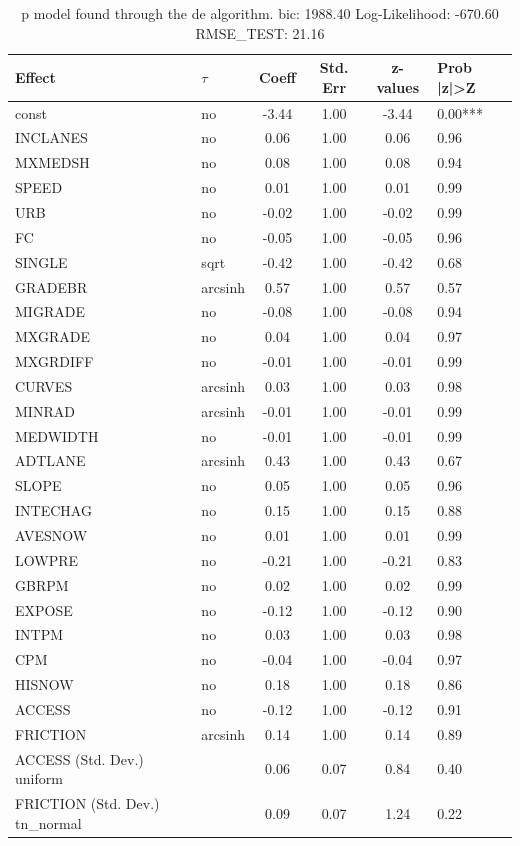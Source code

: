 \begin{table}
	\caption{p model found through the de algorithm. bic: 1988.40 Log-Likelihood: -670.60 RMSE_TEST: 21.16}
	\begin{center}
		\begin{tabular}{|l|l|c|c|c|l|}
			\hline
			Effect & $\tau$ & Coeff & Std. Err & z-values & Prob |z|>Z \\
			\hline
			const & no & -3.44 & 1.00 & -3.44 & 0.00*** \\
			\hline
			INCLANES & no & 0.06 & 1.00 & 0.06 & 0.96 \\
			\hline
			MXMEDSH & no & 0.08 & 1.00 & 0.08 & 0.94 \\
			\hline
			SPEED & no & 0.01 & 1.00 & 0.01 & 0.99 \\
			\hline
			URB & no & -0.02 & 1.00 & -0.02 & 0.99 \\
			\hline
			FC & no & -0.05 & 1.00 & -0.05 & 0.96 \\
			\hline
			SINGLE & sqrt & -0.42 & 1.00 & -0.42 & 0.68 \\
			\hline
			GRADEBR & arcsinh & 0.57 & 1.00 & 0.57 & 0.57 \\
			\hline
			MIGRADE & no & -0.08 & 1.00 & -0.08 & 0.94 \\
			\hline
			MXGRADE & no & 0.04 & 1.00 & 0.04 & 0.97 \\
			\hline
			MXGRDIFF & no & -0.01 & 1.00 & -0.01 & 0.99 \\
			\hline
			CURVES & arcsinh & 0.03 & 1.00 & 0.03 & 0.98 \\
			\hline
			MINRAD & arcsinh & -0.01 & 1.00 & -0.01 & 0.99 \\
			\hline
			MEDWIDTH & no & -0.01 & 1.00 & -0.01 & 0.99 \\
			\hline
			ADTLANE & arcsinh & 0.43 & 1.00 & 0.43 & 0.67 \\
			\hline
			SLOPE & no & 0.05 & 1.00 & 0.05 & 0.96 \\
			\hline
			INTECHAG & no & 0.15 & 1.00 & 0.15 & 0.88 \\
			\hline
			AVESNOW & no & 0.01 & 1.00 & 0.01 & 0.99 \\
			\hline
			LOWPRE & no & -0.21 & 1.00 & -0.21 & 0.83 \\
			\hline
			GBRPM & no & 0.02 & 1.00 & 0.02 & 0.99 \\
			\hline
			EXPOSE & no & -0.12 & 1.00 & -0.12 & 0.90 \\
			\hline
			INTPM & no & 0.03 & 1.00 & 0.03 & 0.98 \\
			\hline
			CPM & no & -0.04 & 1.00 & -0.04 & 0.97 \\
			\hline
			HISNOW & no & 0.18 & 1.00 & 0.18 & 0.86 \\
			\hline
			ACCESS & no & -0.12 & 1.00 & -0.12 & 0.91 \\
			\hline
			FRICTION & arcsinh & 0.14 & 1.00 & 0.14 & 0.89 \\
			\hline
			ACCESS (Std. Dev.) uniform &  & 0.06 & 0.07 & 0.84 & 0.40 \\
			\hline
			FRICTION (Std. Dev.) tn_normal &  & 0.09 & 0.07 & 1.24 & 0.22 \\
			\hline
		\end{tabular}
	\end{center}
\end{table}